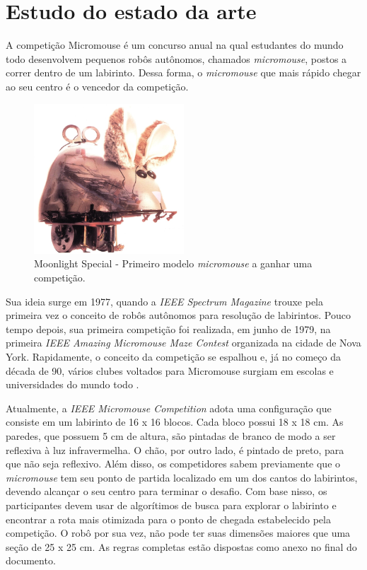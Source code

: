 \section{Estudo do estado da arte}
\label{sec:sota}
 \hspace{0.5cm} A competição Micromouse é um concurso anual na qual estudantes do mundo todo desenvolvem pequenos robôs autônomos, chamados \textit{micromouse}, postos a correr dentro de um labirinto. Dessa forma, o \textit{micromouse} que mais rápido chegar ao seu centro é o vencedor da competição.

 \begin{figure}[H]
 	\centering
 	\includegraphics[width=0.5\textwidth]
 	{Figures/MoonlightSpecial.jpg}
 	\caption{\label{fig:MoonlightSpecial} Moonlight Special - Primeiro modelo \textit{micromouse} a ganhar uma competição.}
 \end{figure}

 \hspace{0.5cm} Sua ideia surge em 1977, quando a \textit{IEEE Spectrum Magazine} trouxe pela primeira vez o conceito de robôs autônomos para resolução de labirintos. Pouco tempo depois, sua primeira competição foi realizada, em junho de 1979, na primeira \textit{IEEE Amazing Micromouse Maze Contest} organizada na cidade de Nova York. Rapidamente, o conceito da competição se espalhou e, já no começo da década de 90, vários clubes voltados para Micromouse surgiam em escolas e universidades do mundo todo \cite{Tondr2004}.
 
 \hspace{0.5cm} Atualmente, a \textit{IEEE Micromouse Competition} adota uma configuração que consiste em um labirinto de 16 x 16 blocos. Cada bloco possui 18 x 18 cm. As paredes, que possuem 5 cm de altura, são pintadas de branco de modo a ser reflexiva à luz infravermelha. O chão, por outro lado, é pintado de preto, para que não seja reflexivo. Além disso, os competidores sabem previamente que o \textit{micromouse} tem seu ponto de partida localizado em um dos cantos do labirintos, devendo alcançar o seu centro para terminar o desafio. Com base nisso, os participantes devem usar de algorítimos de busca para explorar o labirinto e encontrar a rota mais otimizada para o ponto de chegada estabelecido pela competição. O robô por sua vez, não pode ter suas dimensões maiores que uma seção de 25 x 25 cm. As regras completas estão dispostas como anexo no final do documento.


